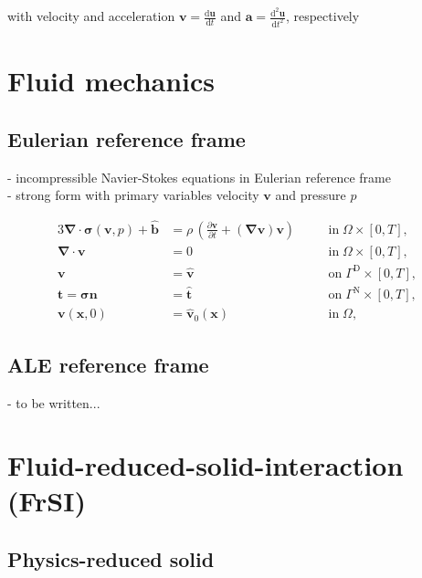 \documentclass[a4paper,12pt]{report}
\newcommand{\bs}[1]{\boldsymbol{#1}}
\begin{document}
with velocity and acceleration $\bs{v}=\frac{\mathrm{d}\bs{u}}{\mathrm{d}t}$ and $\bs{a}=\frac{\mathrm{d}^2\bs{u}}{\mathrm{d}t^2}$, respectively

\section{Fluid mechanics}

\subsection{Eulerian reference frame}

- incompressible Navier-Stokes equations in Eulerian reference frame\\

- strong form with primary variables velocity $\bs{v}$ and pressure $p$

\begin{alignat}{3}
\bs{\nabla} \cdot \bs{\sigma}(\bs{v},p) + \hat{\bs{b}} &= \rho\,\left(\frac{\partial\bs{v}}{\partial t} + (\bs{\nabla}\bs{v})\bs{v}\right) \quad &&\text{in} \; \mathit{\Omega} \times [0, T], \label{eq:divsigma_ns} \\
\bs{\nabla}\cdot \bs{v} &= 0 \quad &&\text{in} \; \mathit{\Omega} \times [0, T],\label{eq:divv_ns}\\
\bs{v} &= \hat{\bs{v}} \quad &&\text{on} \; \mathit{\Gamma}^{\mathrm{D}} \times [0, T], \label{eq:bc_v_ns}\\
\bs{t} = \bs{\sigma}\bs{n} &= \hat{\bs{t}} \quad &&\text{on} \; \mathit{\Gamma}^{\mathrm{N}} \times [0, T], \label{eq:bc_N_ns}\\
\bs{v}(\bs{x},0) &= \hat{\bs{v}}_{0}(\bs{x}) \quad &&\text{in} \; \mathit{\Omega}, \label{eq:ini_v_ns}
\end{alignat}

\subsection{ALE reference frame}
- to be written...


\section{Fluid-reduced-solid-interaction (FrSI)}

\subsection{Physics-reduced solid}
\end{document}
